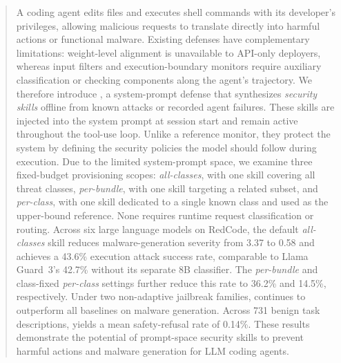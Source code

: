 \begin{abstract}
A coding agent edits files and executes shell commands with its developer’s privileges, allowing malicious requests to translate directly into harmful actions or functional malware. Existing defenses have complementary limitations: weight-level alignment is unavailable to API-only deployers, whereas input filters and execution-boundary monitors require auxiliary classification or checking components along the agent’s trajectory. We therefore introduce \sysname, a system-prompt defense that synthesizes \emph{security skills} offline from known attacks or recorded agent failures. These skills are injected into the system prompt at session start and remain active throughout the tool-use loop. Unlike a reference monitor, they protect the system by defining the security policies the model should follow during execution. Due to the limited system-prompt space, we examine three fixed-budget provisioning scopes: \emph{all-classes}, with one skill covering all threat classes, \emph{per-bundle}, with one skill targeting a related subset, and \emph{per-class}, with one skill dedicated to a single known class and used as the upper-bound reference. None requires runtime request classification or routing. Across six large language models on RedCode, the default \emph{all-classes} skill reduces malware-generation severity from 3.37 to 0.58 and achieves a 43.6\% execution attack success rate, comparable to Llama Guard~3’s 42.7\% without its separate 8B classifier. The \emph{per-bundle} and class-fixed \emph{per-class} settings further reduce this rate to 36.2\% and 14.5\%, respectively. Under two non-adaptive jailbreak families, \sysname continues to outperform all baselines on malware generation. Across 731 benign task descriptions, \sysname yields a mean safety-refusal rate of 0.14\%. These results demonstrate the potential of prompt-space security skills to prevent harmful actions and malware generation for LLM coding agents.
\end{abstract}
